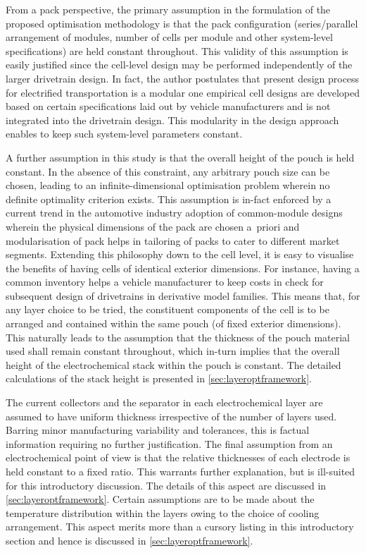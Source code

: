 From  a  pack  perspective,  the   primary  assumption  in  the  formulation  of
the   proposed  optimisation   methodology  is   that  the   pack  configuration
(series/parallel arrangement  of modules, number  of cells per module  and other
system-level specifications) are held constant throughout. This validity of this
assumption  is easily  justified since  the cell-level  design may  be performed
independently of  the larger drivetrain  design. In fact, the  author postulates
that  present design  process for  electrified transportation  is a  modular one
\ie{} empirical cell designs are  developed based on certain specifications laid
out by vehicle  manufacturers and is not integrated into  the drivetrain design.
This  modularity  in the  design  approach  enables  to keep  such  system-level
parameters constant.

A further assumption  in this study is  that the overall height of  the pouch is
held constant. In  the absence of this constraint, any  arbitrary pouch size can
be chosen,  leading to an  infinite-dimensional optimisation problem  wherein no
definite optimality criterion  exists. This assumption is in-fact  enforced by a
current  trend  in the  automotive  industry  \viz{} adoption  of  common-module
designs wherein  the physical  dimensions of  the pack  are chosen  a~priori and
modularisation of pack helps in tailoring  of packs to cater to different market
segments.  Extending this  philosophy down  to  the cell  level, it  is easy  to
visualise the  benefits of  having cells of  identical exterior  dimensions. For
instance, having a  common inventory helps a vehicle manufacturer  to keep costs
in  check  for  subsequent  design  of drivetrains  \eg{}  in  derivative  model
families. This  means that, for  any layer choice  to be tried,  the constituent
components of the cell is to be arranged and contained within the same pouch (of
fixed  exterior dimensions).  This naturally  leads to  the assumption  that the
thickness of  the pouch  material used shall  remain constant  throughout, which
in-turn implies that the overall height  of the electrochemical stack within the
pouch is constant. The detailed calculations of the stack height is presented in
\cref{sec:layeroptframework}.

The  current collectors  and the  separator  in each  electrochemical layer  are
assumed  to  have  uniform  thickness  irrespective  of  the  number  of  layers
used. Barring  minor manufacturing variability  and tolerances, this  is factual
information requiring  no further  justification. The  final assumption  from an
electrochemical point of view is that the relative thicknesses of each electrode
is held  constant to a  fixed ratio. This  warrants further explanation,  but is
ill-suited  for this  introductory discussion.  The details  of this  aspect are
discussed in  \cref{sec:layeroptframework}. Certain  assumptions are to  be made
about the  temperature distribution  within the  layers owing  to the  choice of
cooling arrangement.  This aspect  merits more  than a  cursory listing  in this
introductory section and hence is discussed in \cref{sec:layeroptframework}.

